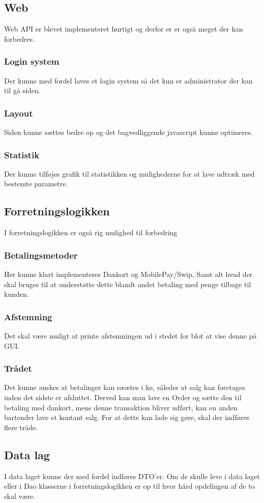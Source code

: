 \subsection{Web}
Web \gls{API} er blevet implementeret hurtigt og derfor er er også meget der kan forbedres.

\subsubsection{Login system}
Der kunne med fordel laves et login system så det kun er administrator der kan til gå siden.

\subsubsection{Layout}
Siden kunne sættes bedre op og det bagvedliggende javascript kunne optimeres.

\subsubsection{Statistik}
Der kunne tilføjes grafik til statistikken og mulighederne for at lave udtræk med bestemte parametre.

\subsection{Forretningslogikken}
I forretningslogikken er også rig mulighed til forbedring

\subsubsection{Betalingsmetoder}
Her kunne klart implementeres Dankort og MobilePay/Swip,
Samt alt hvad der skal bruges til at understøtte dette blandt andet betaling med penge tilbage til kunden.

\subsubsection{Afstemning}
Det skal være muligt at printe afstemningen ud i stedet for blot at vise denne på \gls{GUI}.

\subsubsection{Trådet}
Det kunne ønskes at betalinger kan sæætes i kø, således at salg kan foretages inden det sidste er afsluttet. Derved kan man lave en Order og sætte den til betaling med dankort, mens denne transaktion bliver udført, kan en anden bartender lave et kontant salg. For at dette kan lade sig gøre, skal der indføres flere tråde.

\subsection{Data lag}
I data laget kunne der med fordel indføres \gls{DTO}'er. Om de skulle leve i data laget eller i \gls{Dao} klasserne i forretningslogikken er op til hvor hård opdelingen af de to skal være.